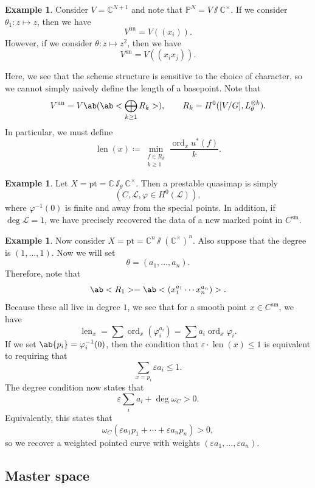 \documentclass{amsart}
\theoremstyle{definition}
\newtheorem{exm}[thm]{Example}
\theoremstyle{remark}
\theoremstyle{plain}
\theoremstyle{definition}
\theoremstyle{remark}
\newcommand{\C}{\mathbb{C}}
\renewcommand{\P}{\mathbb{P}}
\newcommand{\ep}{\varepsilon}
\newcommand{\mc}[1]{\mathcal{#1}}
\newcommand{\mr}[1]{\mathrm{#1}}
\newcommand{\on}[1]{\operatorname{#1}}
\newcommand{\1}{\mathbf{1}}
\newcommand{\2}{\mathbf{2}}
\newcommand{\3}{\mathbf{3}}
\begin{document}
\begin{exm}
    Consider \(V = \C^{N+1}\) and note that \(\P^N = V \sslash \C^{\times}\). If we consider \(\theta_1 \colon z \mapsto z\), then we have 
    \[ V^{\on{un}} = V((x_i)). \]
    However, if we consider \(\theta \colon z \mapsto z^2\), then we have
    \[ V^{\on{un}} = V((x_i x_j)). \]
\end{exm}

Here, we see that the scheme structure is sensitive to the choice of character, so we cannot simply naively define the length of a basepoint. Note that
\[ V^{\on{un}} = V\ab(\ab< \bigoplus_{k \geq 1} R_k>), \qquad R_k = H^0([V/G], L_{\theta}^{\otimes k}). \]
In particular, we must define
\[ \on{len}(x) \coloneqq \min_{\substack{f \in R_k \\ k \geq 1}} \frac{\on{ord}_x u^*(f)}{k}. \]

\begin{exm}
    Let \(X = \mr{pt} = \C \sslash_{\theta} \C^{\times}\). Then a prestable quasimap is simply
    \[ (C, \mc{L}, \varphi \in H^0(\mc{L})), \]
    where \(\varphi^{-1}(0)\) is finite and away from the special points. In addition, if \(\deg \mc{L} = 1\), we have precisely recovered the data of a new marked point in \(C^{\mr{sm}}\).
\end{exm}

\begin{exm}
    Now consider \(X = \mr{pt} = \C^n \sslash (\C^{\times})^n\). Also suppose that the degree is \((1, \ldots, 1)\). Now we will set
    \[ \theta = (a_1, \ldots, a_n). \]
    Therefore, note that
    \[ \ab<R_1> = \ab<(x_1^{a_1} \cdots x_n^{a_n})>. \]
    Because these all live in degree \(1\), we see that for a smooth point \(x \in C^{\mr{sm}}\), we have
    \[ \on{len}_x = \sum \on{ord}_x (\varphi_i^{a_i}) = \sum a_i \on{ord}_x \varphi_i. \]
    If we set \(\ab\{p_i\} = \varphi_i^{-1}(0)\), then the condition that \(\ep \cdot \on{len}(x) \leq 1\) is equivalent to requiring that 
    \[ \sum_{x = p_i} \ep a_i \leq 1. \]
    The degree condition now states that
    \[ \ep \sum_i a_i + \deg \omega_C > 0. \]
    Equivalently, this states that
    \[ \omega_C(\ep a_1 p_1 + \cdots + \ep a_n p_n) > 0, \]
    so we recover a weighted pointed curve with weights \((\ep a_1, \ldots, \ep a_n)\).
\end{exm}

\subsection{Master space}%
\label{sub:Master space}
\end{document}
